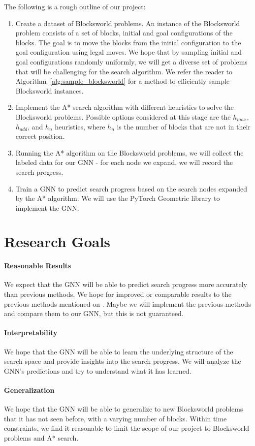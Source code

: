 \documentclass[12pt]{article}
\begin{document}
The following is a rough outline of our project:
\begin{enumerate}
  \item Create a dataset of Blocksworld problems. An instance of the Blocksworld problem consists of a set of blocks, initial and goal configurations of the blocks. The goal is to move the blocks from the initial configuration to the goal configuration using legal moves. We hope that by sampling initial and goal configurations randomly uniformly, we will get a diverse set of problems that will be challenging for the search algorithm. We refer the reader to Algorithm~\ref{alg:sample_blocksworld} for a method to efficiently sample Blocksworld instances.
  \item Implement the A* search algorithm with different heuristics to solve the Blocksworld problems. Possible options considered at this stage are the $h_{max}$, $h_{add}$, and $h_{n}$ heuristics, where $h_{n}$ is the number of blocks that are not in their correct position.
  \item Running the A* algorithm on the Blocksworld problems, we will collect the labeled data for our GNN - for each node we expand, we will record the search progress.
  \item Train a GNN to predict search progress based on the search nodes expanded by the A* algorithm. We will use the PyTorch Geometric library to implement the GNN.
\end{enumerate}

\section{Research Goals}

\paragraph{Reasonable Results} We expect that the GNN will be able to predict search progress more accurately than previous methods. We hope for improved or comparable results to the previous methods mentioned on \citet{sudry2022learning}. Maybe we will implement the previous methods and compare them to our GNN, but this is not guaranteed.

\paragraph{Interpretability} We hope that the GNN will be able to learn the underlying structure of the search space and provide insights into the search progress. We will analyze the GNN's predictions and try to understand what it has learned.

\paragraph{Generalization} We hope that the GNN will be able to generalize to new Blocksworld problems that it has not seen before, with a varying number of blocks. Within time constraints, we find it reasonable to limit the scope of our project to Blocksworld problems and A* search. 


\end{document}
